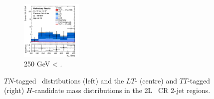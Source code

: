 \begin{figure}[h!]
\begin{subfigure}[b]{\textwidth}
        \includegraphics[width=0.32\textwidth]{Images/VH/Own_fit/postfit_VHcc/Region_distmBB_BMin250_DCRHigh_J2_TTypett_T2_L2_Y6051_GlobalFit_conditionnal_mu1.png}
        \caption{250 GeV < \ptv.}
        \label{fig:plots_VHcc_2L_250_CRH_2J}
    \end{subfigure}
    \caption{$TN$-tagged \ptv\ distributions (left) and the $LT$- (centre) and $TT$-tagged (right) $H$-candidate mass distributions in the 2L \highdr\ CR 2-jet regions.}
    \label{fig:plots_VHcc_2L_CRH_3J}
\end{figure}

\vspace*{\fill} \newpage
\vspace*{\fill} 

